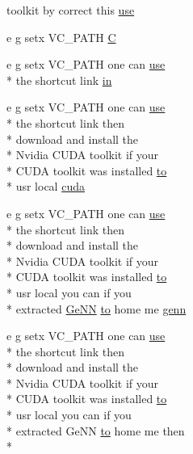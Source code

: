 \begin{DoxyCompactItemize}
toolkit by correct this \hyperlink{README_8txt_acf386c48a14a2099c9220d6bcde40fc8}{use}
\item 
e g setx V\+C\+\_\+\+P\+A\+T\+H \hyperlink{README_8txt_aacbc294df2c305f93084b177996ed83c}{C}
\item 
e g setx V\+C\+\_\+\+P\+A\+T\+H one can \hyperlink{README_8txt_acf386c48a14a2099c9220d6bcde40fc8}{use} \\*
the shortcut link \hyperlink{README_8txt_a148897a6b2cc9cff25af80abb13426b0}{in}
\item 
e g setx V\+C\+\_\+\+P\+A\+T\+H one can \hyperlink{README_8txt_acf386c48a14a2099c9220d6bcde40fc8}{use} \\*
the shortcut link then \\*
download and install the \\*
Nvidia C\+U\+D\+A toolkit if your \\*
C\+U\+D\+A toolkit was installed \hyperlink{README_8txt_add1f2ee32acc15ef77f839d4382c9768}{to} \\*
usr local \hyperlink{README_8txt_a386e5818501e36b046e9cf9ee9a1a6b0}{cuda}
\item 
e g setx V\+C\+\_\+\+P\+A\+T\+H one can \hyperlink{README_8txt_acf386c48a14a2099c9220d6bcde40fc8}{use} \\*
the shortcut link then \\*
download and install the \\*
Nvidia C\+U\+D\+A toolkit if your \\*
C\+U\+D\+A toolkit was installed \hyperlink{README_8txt_add1f2ee32acc15ef77f839d4382c9768}{to} \\*
usr local you can if you \\*
extracted \hyperlink{README_8txt_a431a8d9aae97c72793fee7c3edd68559}{Ge\+N\+N} \hyperlink{README_8txt_add1f2ee32acc15ef77f839d4382c9768}{to} home me \hyperlink{README_8txt_ad901b58517668ecb7d9abc2ae15010dc}{genn}
\item 
e g setx V\+C\+\_\+\+P\+A\+T\+H one can \hyperlink{README_8txt_acf386c48a14a2099c9220d6bcde40fc8}{use} \\*
the shortcut link then \\*
download and install the \\*
Nvidia C\+U\+D\+A toolkit if your \\*
C\+U\+D\+A toolkit was installed \hyperlink{README_8txt_add1f2ee32acc15ef77f839d4382c9768}{to} \\*
usr local you can if you \\*
extracted Ge\+N\+N \hyperlink{README_8txt_add1f2ee32acc15ef77f839d4382c9768}{to} home me then \\*

\end{DoxyCompactItemize}
